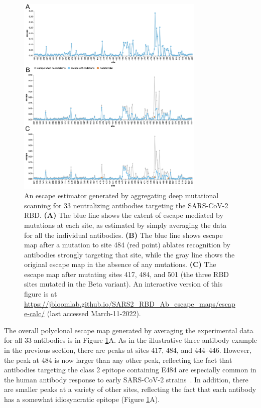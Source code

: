 \documentclass[9pt,twocolumn,twoside]{gsajnl_modified}
\begin{document}
\begin{figure}
\includegraphics[width=0.8\textwidth]{figures/escape_calc/escape_calc.pdf}
\caption{
An escape estimator generated by aggregating deep mutational scanning for 33 neutralizing antibodies targeting the SARS-CoV-2 RBD.
{\bf (A)} The blue line shows the extent of escape mediated by mutations at each site, as estimated by simply averaging the data for all the individual antibodies.
{\bf (B)} The blue line shows escape map after a mutation to site 484 (red point) ablates recognition by antibodies strongly targeting that site, while the gray line shows the original escape map in the absence of any mutations.
{\bf (C)} The escape map after mutating sites 417, 484, and 501 (the three RBD sites mutated in the Beta variant).
An interactive version of this figure is at \url{https://jbloomlab.github.io/SARS2_RBD_Ab_escape_maps/escape-calc/} (last accessed March-11-2022).}
\label{fig:escape_calc}
\end{figure}

The overall polyclonal escape map generated by averaging the experimental data for all 33 antibodies is in Figure \ref{fig:escape_calc}A.
As in the illustrative three-antibody example in the previous section, there are peaks at  sites 417, 484, and 444--446.
However, the peak at 484 is now larger than any other peak, reflecting the fact that antibodies targeting the class 2 epitope containing E484 are especially common in the human antibody response to early SARS-CoV-2 strains~\citep{yuan2020structural,robbiani2020convergent,greaney2021comprehensive,greaney2021mapping,chen2021convergent}.
In addition, there are smaller peaks at a variety of other sites, reflecting the fact that each antibody has a somewhat idiosyncratic epitope (Figure \ref{fig:escape_calc}A).
\end{document}
